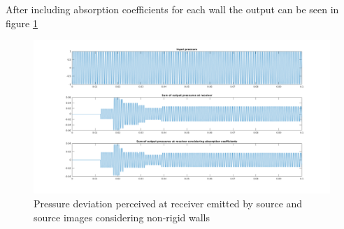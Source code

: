 After including absorption coefficients for each wall the output can be seen in figure \ref{fig:ism_4_2_2_mat_abs}
\begin{figure}

    \centerline{\includegraphics[width=1.5\textwidth,keepaspectratio]{LaTeX/images/plots/matlab_4_walls_2_order_2_abs.png}}
    \caption{Pressure deviation perceived at receiver emitted by source and source images considering non-rigid walls}
    \label{fig:ism_4_2_2_mat_abs}
\end{figure}